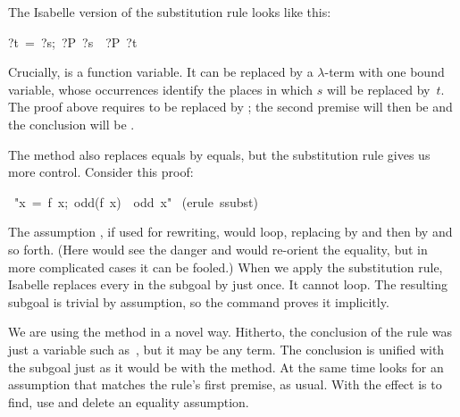 The Isabelle version of the substitution rule looks like this: 
\begin{isabelle}
\isasymlbrakk?t\ =\ ?s;\ ?P\ ?s\isasymrbrakk\ \isasymLongrightarrow\ ?P\
?t
\end{isabelle}
Crucially,  is a function 
variable.  It can be replaced by a $\lambda$-term 
with one bound variable, whose occurrences identify the places 
in which $s$ will be replaced by~$t$.  The proof above requires 
to be replaced by \isa{{\isasymlambda}x.~x=s}; the second premise will then
be \isa{s=s} and the conclusion will be \isa{t=s}.

The  method also replaces equals by equals, but the substitution
rule gives us more control.  Consider this proof: 
\begin{isabelle}
\
"\isasymlbrakk x\ =\ f\ x;\ odd(f\ x)\isasymrbrakk\ \isasymLongrightarrow\
odd\ x"\isanewline
\isacommand{by}\ (erule\ ssubst)
\end{isabelle}
%
The assumption , if used for rewriting, would loop, 
replacing  by  and then by
 and so forth. (Here  
would see the danger and would re-orient the equality, but in more complicated
cases it can be fooled.) When we apply the substitution rule,  
Isabelle replaces every
\isa{x} in the subgoal by \isa{f x} just once. It cannot loop.  The
resulting subgoal is trivial by assumption, so the  command
proves it implicitly. 

We are using the \isa{erule} method in a novel way. Hitherto, 
the conclusion of the rule was just a variable such as~, but it may
be any term. The conclusion is unified with the subgoal just as 
it would be with the \isa{rule} method. At the same time  looks 
for an assumption that matches the rule's first premise, as usual.  With
\isa{ssubst} the effect is to find, use and delete an equality 
assumption.

